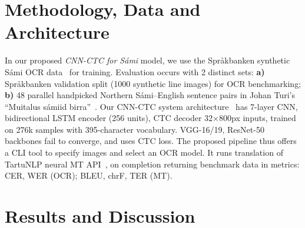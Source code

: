 \documentclass[runningheads]{llncs}
\newcommand{\benchmarkSamples}{1048}  %
\newcommand{\hfTestSamples}{1000}    %
\newcommand{\bookTestSamples}{48}    %
\begin{document}
\section{Methodology, Data and Architecture}
\vspace{-0.2cm}
In our proposed {\it CNN-CTC for S\'{a}mi} model, we use the Spr\r{a}kbanken synthetic S\'{a}mi OCR data~\cite{ref_sprakbanken} for training. Evaluation occurs with 2 distinct sets: \textbf{a)} Spr\r{a}kbanken validation split (\hfTestSamples{} synthetic line images) for OCR benchmarking; \textbf{b)} \bookTestSamples{} parallel handpicked Northern S\'{a}mi--English sentence pairs in Johan Turi's ``Muitalus s\'{a}miid birra''~\cite{ref_turi}.
Our CNN-CTC system architecture~\cite{ref_crnn} has
7-layer CNN, bidirectional LSTM encoder (256 units), CTC decoder 32×800px inputs, trained on 276k samples with 395-character vocabulary. VGG-16/19, ResNet-50 backbones fail to converge, and uses CTC loss.
The proposed pipeline thus offers a CLI tool to specify images and select an OCR model. It runs translation of TartuNLP neural MT API~\cite{ref_tartunlp}, on completion returning benchmark data in metrics: CER, WER (OCR); BLEU,
chrF,
TER (MT).

\vspace{-0.6cm}
\section{Results and Discussion}

\end{document}

